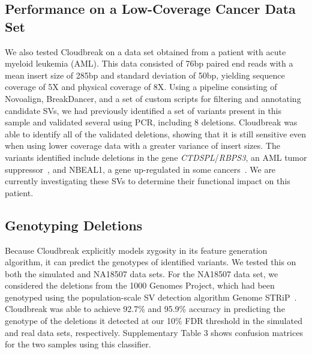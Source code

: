 \documentclass{bioinfo}
\newcommand{\todo}[1]{}
\begin{document}
\subsection{Performance on a Low-Coverage Cancer Data Set}

We also tested Cloudbreak on a data set obtained from a patient with acute myeloid leukemia (AML). This data consisted of 76bp paired end reads with a mean insert size of 285bp and standard deviation of 50bp, yielding sequence coverage of 5X and physical coverage of 8X. Using a pipeline consisting of Novoalign, BreakDancer, and a set of custom scripts for filtering and annotating candidate SVs, we had previously identified a set of variants present in this sample and validated several using PCR, including 8 deletions. Cloudbreak was able to identify all of the validated deletions, showing that it is still sensitive even when using lower coverage data with a greater variance of insert sizes. The variants identified include deletions in the gene \emph{CTDSPL}/\emph{RBPS3}, an AML tumor suppressor~\citep{Zheng:2012kk}, and NBEAL1, a gene up-regulated in some cancers~\citep{Chen:2004jo}. We are currently investigating these SVs to determine their functional impact on this patient. 

\subsection{Genotyping Deletions}\label{section_results_genotyping}

Because Cloudbreak explicitly models zygosity in its feature generation algorithm, it can predict the genotypes of identified variants. We tested this on both the simulated and NA18507 data sets. For the NA18507 data set, we considered the deletions from the 1000 Genomes Project, which had been genotyped using the population-scale SV detection algorithm Genome STRiP~\citep{Handsaker:2011ki}. Cloudbreak was able to achieve 92.7\% and 95.9\% accuracy in predicting the genotype of the deletions it detected at our 10\% FDR threshold in the simulated and real data sets, respectively. Supplementary Table 3\todo{\ref{SdeletionGenotypeaccuracy}} shows confusion matrices for the two samples using this classifier. \todo{None of the three input sets that made up the gold standard for NA18507 contained a sufficient number of insertions that met our size threshold and also had genotyping information. Of the 123 insertions detected by Cloudbreak on the simulated data set, 43 were heterozygous. Cloudbreak correctly classified 78 of the 80 homozygous insertions and 31 of the 43 heterozygous insertions, for an overall accuracy of 88.6\%.}
\end{document}
